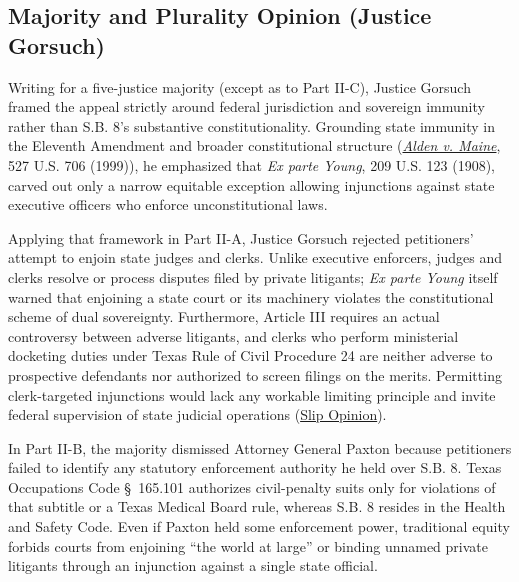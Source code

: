 \documentclass[12pt]{article}
\begin{document}
\subsection{Majority and Plurality Opinion (Justice Gorsuch)}

Writing for a five-justice majority (except as to Part II-C), Justice Gorsuch framed the appeal strictly around federal jurisdiction and sovereign immunity rather than S.B. 8's substantive constitutionality. Grounding state immunity in the Eleventh Amendment and broader constitutional structure (\href{https://supreme.justia.com/cases/federal/us/527/706/}{\textit{Alden v. Maine}}, 527 U.S. 706 (1999)), he emphasized that \textit{Ex parte Young}, 209 U.S. 123 (1908), carved out only a narrow equitable exception allowing injunctions against state executive officers who enforce unconstitutional laws.

Applying that framework in Part II-A, Justice Gorsuch rejected petitioners' attempt to enjoin state judges and clerks. Unlike executive enforcers, judges and clerks resolve or process disputes filed by private litigants; \textit{Ex parte Young} itself warned that enjoining a state court or its machinery violates the constitutional scheme of dual sovereignty. Furthermore, Article III requires an actual controversy between adverse litigants, and clerks who perform ministerial docketing duties under Texas Rule of Civil Procedure 24 are neither adverse to prospective defendants nor authorized to screen filings on the merits. Permitting clerk-targeted injunctions would lack any workable limiting principle and invite federal supervision of state judicial operations (\href{https://supreme.justia.com/cases/federal/us/595/21-463/}{Slip Opinion}).

In Part II-B, the majority dismissed Attorney General Paxton because petitioners failed to identify any statutory enforcement authority he held over S.B. 8. Texas Occupations Code \S~165.101 authorizes civil-penalty suits only for violations of that subtitle or a Texas Medical Board rule, whereas S.B. 8 resides in the Health and Safety Code. Even if Paxton held some enforcement power, traditional equity forbids courts from enjoining ``the world at large'' or binding unnamed private litigants through an injunction against a single state official.
\end{document}
